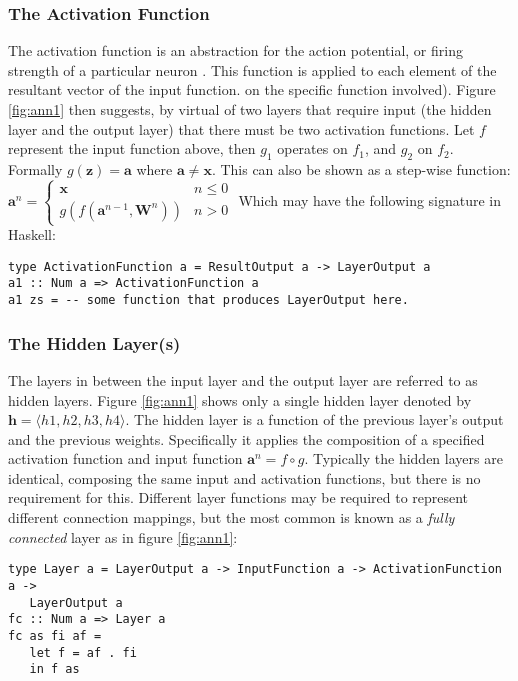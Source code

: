 \documentclass[a4paper]{article}
\begin{document}
\subsubsection{The Activation Function}
The activation function is an abstraction for the action potential, or 
firing strength of a particular neuron \cite{Haykin:2007:NNC:1213811}.
This function is applied to each element of the resultant vector of the input
function. on the specific function involved).  Figure \ref{fig:ann1} then 
suggests, by virtual of two layers that require input (the hidden layer and
the output layer) that there must be two activation functions. Let $f$
represent the input function above, then $g_1$
operates on $f_1$, and $g_2$ on $f_2$. Formally $g(\boldsymbol{z}) =
\boldsymbol{a}$ where $\boldsymbol{a} \neq \boldsymbol{x}$. This can also be
shown as a step-wise function:  $\boldsymbol{a}^n = 
   \begin{cases}
   \boldsymbol{x} & n \leq 0 \\
   g(f(\boldsymbol{a}^{n - 1}, \boldsymbol{W}^{n})) & n > 0
   \end{cases}
$ Which may have the following signature in Haskell:
\begin{verbatim}
type ActivationFunction a = ResultOutput a -> LayerOutput a
a1 :: Num a => ActivationFunction a
a1 zs = -- some function that produces LayerOutput here.
\end{verbatim}

\subsubsection{The Hidden Layer(s)}
The layers in between the input layer and the output layer are referred to as
hidden layers. Figure \ref{fig:ann1} shows only a single hidden layer denoted
by $\boldsymbol{h} = \langle h1, h2, h3, h4 \rangle$. The hidden layer is a
function of the previous layer's output and the previous weights. Specifically
it applies the composition of a specified activation function and input 
function $\boldsymbol{a}^n = f \circ g$. Typically the hidden layers are
identical, composing the same input and activation functions, but there is 
no requirement for this. Different layer functions may be required to represent
different connection mappings, but the most common is known as a \textit{fully
connected} layer as in figure \ref{fig:ann1}:
\begin{verbatim}
type Layer a = LayerOutput a -> InputFunction a -> ActivationFunction a -> 
   LayerOutput a
fc :: Num a => Layer a 
fc as fi af = 
   let f = af . fi
   in f as
\end{verbatim}
\end{document}
